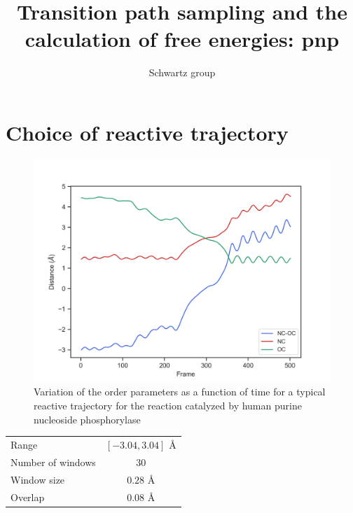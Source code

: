 \documentclass{report}
\title{Transition path sampling and the calculation of free energies: pnp}
\author{Schwartz group}
\begin{document}
\maketitle

\section{Choice of reactive trajectory}
\begin{figure}[ht!]
\centering
\includegraphics[scale=0.75]{figures/dis_nc-oc-90.png}
\caption{Variation of the order parameters as a function of time for a typical 
reactive trajectory for the reaction catalyzed by human purine nucleoside phosphorylase}
\label{fig:fig}
\end{figure}

\begin{center}
  \begin{tabular}{ l | c  }
    \hline
    Range & $\left[-3.04,3.04\right]$ {\AA}\\ 
    Number of windows & 30  \\ 
    Window size & $0.28$ {\AA} \\
    Overlap & 0.08 {\AA} \\
    \hline
  \end{tabular}
\end{center}
\end{document}
